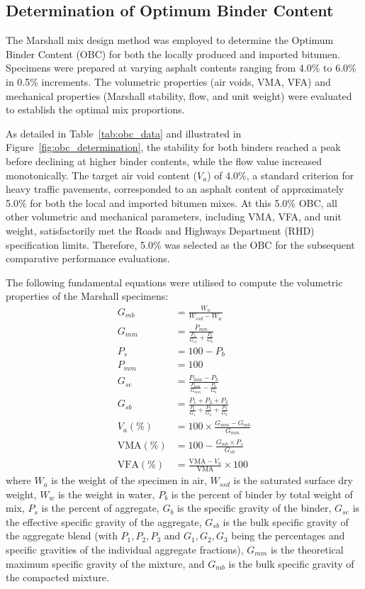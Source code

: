 \documentclass[12pt,a4paper]{article}
\begin{document}
\subsection{Determination of Optimum Binder Content}

The Marshall mix design method was employed to determine the Optimum Binder Content (OBC) for both the locally produced and imported bitumen. Specimens were prepared at varying asphalt contents ranging from 4.0\% to 6.0\% in 0.5\% increments. The volumetric properties (air voids, VMA, VFA) and mechanical properties (Marshall stability, flow, and unit weight) were evaluated to establish the optimal mix proportions. 

As detailed in Table~\ref{tab:obc_data} and illustrated in Figure~\ref{fig:obc_determination}, the stability for both binders reached a peak before declining at higher binder contents, while the flow value increased monotonically. The target air void content ($V_a$) of 4.0\%, a standard criterion for heavy traffic pavements, corresponded to an asphalt content of approximately 5.0\% for both the local and imported bitumen mixes. At this 5.0\% OBC, all other volumetric and mechanical parameters, including VMA, VFA, and unit weight, satisfactorily met the Roads and Highways Department (RHD) specification limits. Therefore, 5.0\% was selected as the OBC for the subsequent comparative performance evaluations.

The following fundamental equations were utilised to compute the volumetric properties of the Marshall specimens:
\begin{align}
    G_{mb} &= \frac{W_a}{W_{ssd} - W_w} \\
    G_{mm} &= \frac{P_{mm}}{\frac{P_s}{G_{se}} + \frac{P_b}{G_b}} \\
    P_s &= 100 - P_b \\
    P_{mm} &= 100 \\
    G_{se} &= \frac{P_{mm} - P_b}{\frac{P_{mm}}{G_{mm}} - \frac{P_b}{G_b}} \\
    G_{sb} &= \frac{P_1 + P_2 + P_3}{\frac{P_1}{G_1} + \frac{P_2}{G_2} + \frac{P_3}{G_3}} \\
    V_a (\%) &= 100 \times \frac{G_{mm} - G_{mb}}{G_{mm}} \\
    \text{VMA} (\%) &= 100 - \frac{G_{mb} \times P_s}{G_{sb}} \\
    \text{VFA} (\%) &= \frac{\text{VMA} - V_a}{\text{VMA}} \times 100
\end{align}
where $W_a$ is the weight of the specimen in air, $W_{ssd}$ is the saturated surface dry weight, $W_w$ is the weight in water, $P_b$ is the percent of binder by total weight of mix, $P_s$ is the percent of aggregate, $G_b$ is the specific gravity of the binder, $G_{se}$ is the effective specific gravity of the aggregate, $G_{sb}$ is the bulk specific gravity of the aggregate blend (with $P_1, P_2, P_3$ and $G_1, G_2, G_3$ being the percentages and specific gravities of the individual aggregate fractions), $G_{mm}$ is the theoretical maximum specific gravity of the mixture, and $G_{mb}$ is the bulk specific gravity of the compacted mixture.
\end{document}
